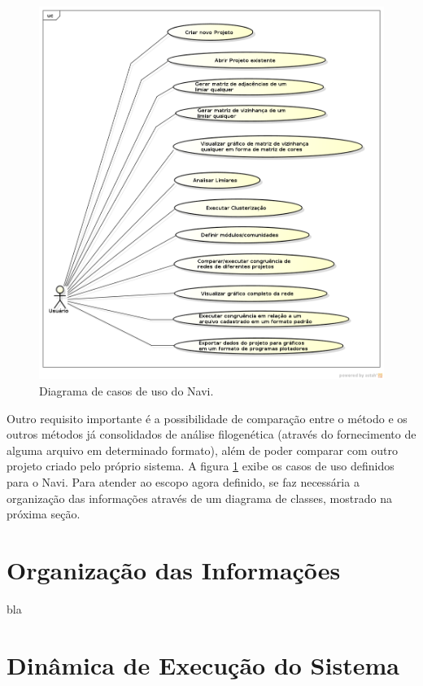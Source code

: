 \begin{figure}
\centering
\includegraphics[scale=0.52]{diagrama-casos-de-uso}
\caption{Diagrama de casos de uso do Navi.}
\label{fig:casos-uso}
\end{figure}

Outro requisito importante é a possibilidade de comparação entre o método e os outros métodos já consolidados de análise filogenética (através do fornecimento
de alguma arquivo em determinado formato), além de poder comparar com outro projeto criado pelo próprio sistema. A figura \ref{fig:casos-uso} exibe os casos
de uso definidos para o Navi. Para atender ao escopo agora definido, se faz necessária a organização das informações através de um diagrama de classes,
mostrado na próxima seção.

\section{Organização das Informações} \label{sec:organizacao}

bla

\section{Dinâmica de Execução do Sistema} \label{sec:dinamica}

